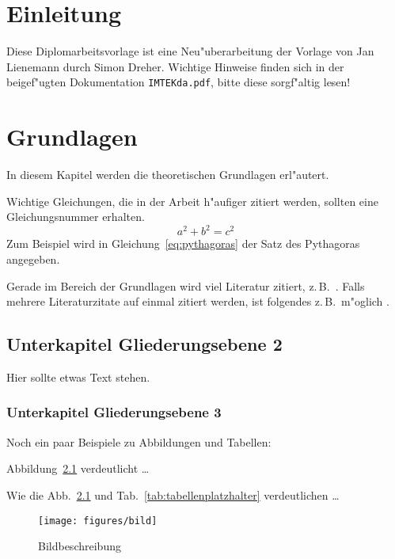 \documentclass[diplom,         %
               12pt,           %
               twoside,        %
               BCOR10mm,       %
               english,ngerman, %
               ]{IMTEKda}
\begin{document}
\listoffigures
\listoftables

\mainmatter   %

\chapter{Einleitung}
Diese Diplomarbeitsvorlage ist eine Neu"uberarbeitung der Vorlage von Jan
Lienemann durch Simon Dreher. Wichtige Hinweise finden sich in der beigef"ugten
Dokumentation \verb|IMTEKda.pdf|, bitte diese sorgf"altig lesen!

\chapter{Grundlagen}
In diesem Kapitel werden die theoretischen Grundlagen erl"autert.

Wichtige Gleichungen, die in der Arbeit h"aufiger zitiert werden,
sollten eine Gleichungsnummer erhalten.
\begin{equation}
  \label{eq:pythagoras}
  a^2+b^2=c^2
\end{equation}
Zum Beispiel wird in Gleichung~\ref{eq:pythagoras} der Satz des Pythagoras
angegeben.

Gerade im Bereich der Grundlagen wird viel Literatur zitiert, z.\,B.\
\cite{Menz97}. Falls
mehrere Literaturzitate auf einmal zitiert werden, ist folgendes
z.\,B.\ m"oglich \cite{Horn90,DINEN6232,Menz97,Knuth84}.

\section{Unterkapitel Gliederungsebene 2}
Hier sollte etwas Text stehen.
\subsection{Unterkapitel Gliederungsebene 3}
Noch ein paar Beispiele zu Abbildungen und Tabellen:

Abbildung~\ref{fig:bildplatzhalter} verdeutlicht \dots

Wie die Abb.~\ref{fig:bildplatzhalter} und
Tab.~\ref{tab:tabellenplatzhalter} verdeutlichen \dots

\begin{figure}
  \centering
  \texttt{[image: figures/bild]}
  \caption{Bildbeschreibung}
  \label{fig:bildplatzhalter}
\end{figure}
\end{document}
